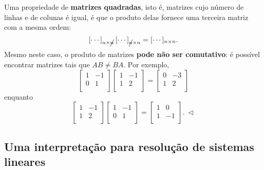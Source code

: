 \documentclass[../livro.tex]{subfiles}  %
\begin{document}
\begin{example}
	Uma propriedade de \textbf{matrizes quadradas}, isto é, matrizes cujo número de linhas e de colunas é igual, é que o produto delas fornece uma terceira matriz com a mesma ordem:
	\[
	[\cdots]_{n \times \cancel{n}} \, [\cdots]_{\cancel{n} \times n} = [\cdots]_{n \times n}.
	\] Mesmo neste caso, o produto de matrizes \textbf{pode não ser comutativo}: é possível encontrar matrizes tais que $AB \neq BA$. Por exemplo,
	\[
	\left[
	\begin{array}{cc}
	1 & -1  \\
	0 &  1  \\
	\end{array}
	\right]
	\left[
	\begin{array}{cc}
	1 & -1  \\
	1 &  2  \\
	\end{array}
	\right] =
	\left[
	\begin{array}{cc}
	0 & -3  \\
	1 &  2  \\
	\end{array}
	\right]
	\] enquanto
	\[
	\left[
	\begin{array}{cc}
	1 & -1  \\
	1 &  2  \\
	\end{array}
	\right]
	\left[
	\begin{array}{cc}
	1 & -1  \\
	0 &  1  \\
	\end{array}
	\right] =
	\left[
	\begin{array}{cc}
	1 & 0  \\
	1 & -1  \\
	\end{array}
	\right]. \ \lhd
	\]
\end{example}





\subsection{Uma interpretação para resolução de sistemas lineares}\label{scn:resolucao-2-sistemas}
\end{document}
